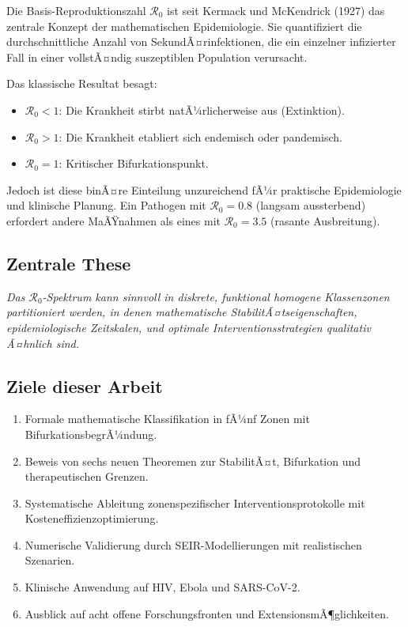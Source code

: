 ﻿\documentclass[a4paper,12pt,twoside]{article}
\theoremstyle{definition}
\begin{document}
Die Basis-Reproduktionszahl $\mathcal{R}_0$ ist seit Kermack und McKendrick (1927) das zentrale Konzept der mathematischen Epidemiologie. Sie quantifiziert die durchschnittliche Anzahl von SekundÃ¤rinfektionen, die ein einzelner infizierter Fall in einer vollstÃ¤ndig suszeptiblen Population verursacht.

Das klassische Resultat besagt:
\begin{itemize}
\item $\mathcal{R}_0 < 1$: Die Krankheit stirbt natÃ¼rlicherweise aus (Extinktion).
\item $\mathcal{R}_0 > 1$: Die Krankheit etabliert sich endemisch oder pandemisch.
\item $\mathcal{R}_0 = 1$: Kritischer Bifurkationspunkt.
\end{itemize}

Jedoch ist diese binÃ¤re Einteilung unzureichend fÃ¼r praktische Epidemiologie und klinische Planung. Ein Pathogen mit $\mathcal{R}_0 = 0.8$ (langsam aussterbend) erfordert andere MaÃŸnahmen als eines mit $\mathcal{R}_0 = 3.5$ (rasante Ausbreitung).

\subsection{Zentrale These}

\emph{Das $\mathcal{R}_0$-Spektrum kann sinnvoll in diskrete, funktional homogene Klassenzonen partitioniert werden, in denen mathematische StabilitÃ¤tseigenschaften, epidemiologische Zeitskalen, und optimale Interventionsstrategien qualitativ Ã¤hnlich sind.}

\subsection{Ziele dieser Arbeit}

\begin{enumerate}
\item Formale mathematische Klassifikation in fÃ¼nf Zonen mit BifurkationsbegrÃ¼ndung.
\item Beweis von sechs neuen Theoremen zur StabilitÃ¤t, Bifurkation und therapeutischen Grenzen.
\item Systematische Ableitung zonenspezifischer Interventionsprotokolle mit Kosteneffizienzoptimierung.
\item Numerische Validierung durch SEIR-Modellierungen mit realistischen Szenarien.
\item Klinische Anwendung auf HIV, Ebola und SARS-CoV-2.
\item Ausblick auf acht offene Forschungsfronten und ExtensionsmÃ¶glichkeiten.
\end{enumerate}
\end{document}
